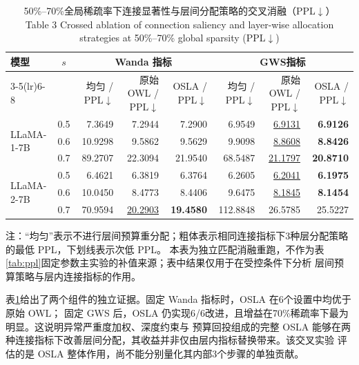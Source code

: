 \documentclass[UTF8,fontset=fandol]{ctexart}
\renewcommand{\arraystretch}{1.08}
\newcommand{\gws}{\textsc{GWS}}
\newcommand{\best}[1]{\textbf{#1}}
\newcommand{\second}[1]{\underline{#1}}
\begin{document}
\begin{table}[!htbp]
\centering
\caption{50\%--70\%全局稀疏率下连接显著性与层间分配策略的交叉消融（PPL$\downarrow$）\\
Table 3 Crossed ablation of connection saliency and layer-wise allocation strategies at 50\%--70\% global sparsity (PPL$\downarrow$)}
\label{tab:ablation}
\scriptsize
\setlength{\tabcolsep}{4.2pt}
\renewcommand{\arraystretch}{0.98}
\begin{tabular*}{0.92\textwidth}{@{\extracolsep{\fill}}lcrrrrrr@{}}
\toprule
\multirow{2}{*}{模型} & \multirow{2}{*}{$s$} &
\multicolumn{3}{c}{Wanda 指标} & \multicolumn{3}{c}{\gws 指标} \\
\cmidrule(lr){3-5}\cmidrule(lr){6-8}
 & & 均匀 / PPL$\downarrow$ & 原始 OWL / PPL$\downarrow$ & OSLA / PPL$\downarrow$ & 均匀 / PPL$\downarrow$ & 原始 OWL / PPL$\downarrow$ & OSLA / PPL$\downarrow$ \\
\midrule
\multirow{3}{*}{LLaMA-1-7B}
 & 0.5 & 7.3649 & 7.2944 & 7.2900 & 6.9549 & \second{6.9131} & \best{6.9126} \\
 & 0.6 & 10.9298 & 9.5862 & 9.5629 & 9.9098 & \second{8.8608} & \best{8.8426} \\
 & 0.7 & 89.2707 & 22.3094 & 21.9540 & 68.5487 & \second{21.1797} & \best{20.8710} \\
\midrule
\multirow{3}{*}{LLaMA-2-7B}
 & 0.5 & 6.4621 & 6.3819 & 6.3764 & 6.2605 & \second{6.2041} & \best{6.1975} \\
 & 0.6 & 10.0450 & 8.4773 & 8.4406 & 9.6475 & \second{8.1845} & \best{8.1454} \\
 & 0.7 & 70.9594 & \second{20.2903} & \best{19.4580} & 112.8848 & 26.5785 & 25.5227 \\
\bottomrule
\end{tabular*}
\vspace{2pt}
\parbox{0.92\textwidth}{\scriptsize
注：“均匀”表示不进行层间预算重分配；粗体表示相同连接指标下3种层分配策略的最低 PPL，下划线表示次低 PPL。
本表为独立匹配消融重跑，不作为表\ref{tab:ppl}固定参数主实验的补值来源；表中结果仅用于在受控条件下分析
层间预算策略与层内连接指标的作用。}
\end{table}

表\ref{tab:ablation}给出了两个组件的独立证据。固定 Wanda 指标时，OSLA 在6个设置中均优于原始 OWL；
固定 GWS 后，OSLA 仍实现6/6改进，且增益在70\%稀疏率下最为明显。这说明异常严重度加权、深度约束与
预算回投组成的完整 OSLA 能够在两种连接指标下改善层间分配，其收益并非仅由层内指标替换带来。该交叉实验
评估的是 OSLA 整体作用，尚不能分别量化其内部3个步骤的单独贡献。
\end{document}
